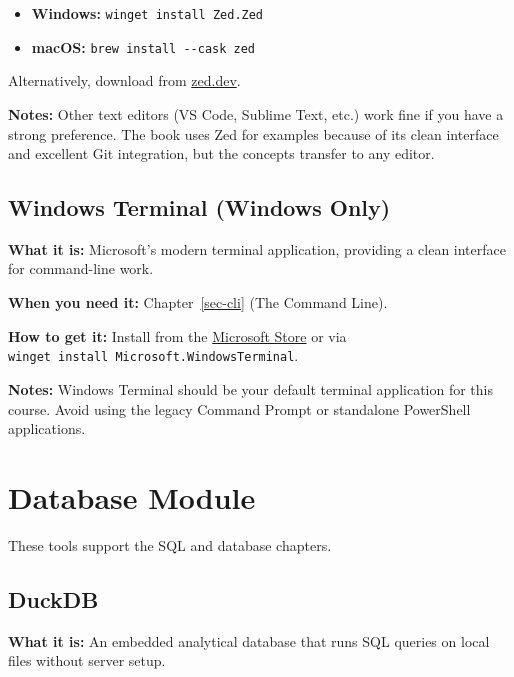 \documentclass[
  letterpaper,
  DIV=11,
  numbers=noendperiod]{scrreprt}
\providecommand{\tightlist}{%
  \setlength{\itemsep}{0pt}\setlength{\parskip}{0pt}}
\begin{document}
\begin{itemize}
\tightlist
\item
  \textbf{Windows:} \texttt{winget\ install\ Zed.Zed}
\item
  \textbf{macOS:} \texttt{brew\ install\ -\/-cask\ zed}
\end{itemize}

Alternatively, download from \href{https://zed.dev}{zed.dev}.

\textbf{Notes:} Other text editors (VS Code, Sublime Text, etc.) work
fine if you have a strong preference. The book uses Zed for examples
because of its clean interface and excellent Git integration, but the
concepts transfer to any editor.

\subsection*{Windows Terminal (Windows
Only)}\label{windows-terminal-windows-only}

\textbf{What it is:} Microsoft's modern terminal application, providing
a clean interface for command-line work.

\textbf{When you need it:} Chapter~\ref{sec-cli} (The Command Line).

\textbf{How to get it:} Install from the
\href{https://aka.ms/terminal}{Microsoft Store} or via
\texttt{winget\ install\ Microsoft.WindowsTerminal}.

\textbf{Notes:} Windows Terminal should be your default terminal
application for this course. Avoid using the legacy Command Prompt or
standalone PowerShell applications.

\section*{Database Module}\label{database-module}


These tools support the SQL and database chapters.

\subsection*{DuckDB}\label{duckdb}

\textbf{What it is:} An embedded analytical database that runs SQL
queries on local files without server setup.
\end{document}
